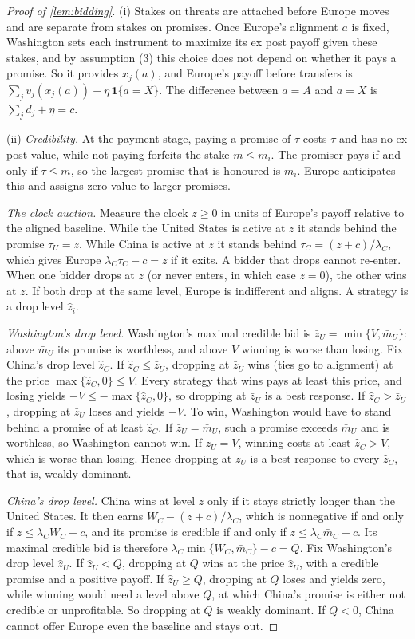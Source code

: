 \begin{proof}[Proof of \cref{lem:bidding}]
(i) Stakes on threats are attached before Europe moves and are separate from stakes on promises. Once Europe's alignment $a$ is fixed, Washington sets each instrument to maximize its ex post payoff given these stakes, and by assumption (3) this choice does not depend on whether it pays a promise. So it provides $x_j(a)$, and Europe's payoff before transfers is $\sum_j v_j(x_j(a))-\eta\,\mathbf 1\{a=X\}$. The difference between $a=A$ and $a=X$ is $\sum_j d_j+\eta=c$.

(ii) \emph{Credibility.} At the payment stage, paying a promise of $\tau$ costs $\tau$ and has no ex post value, while not paying forfeits the stake $m\le\bar m_i$. The promiser pays if and only if $\tau\le m$, so the largest promise that is honoured is $\bar m_i$. Europe anticipates this and assigns zero value to larger promises.

\emph{The clock auction.} Measure the clock $z\ge 0$ in units of Europe's payoff relative to the aligned baseline. While the United States is active at $z$ it stands behind the promise $\tau_U=z$. While China is active at $z$ it stands behind $\tau_C=(z+c)/\lambda_C$, which gives Europe $\lambda_C\tau_C-c=z$ if it exits. A bidder that drops cannot re-enter. When one bidder drops at $z$ (or never enters, in which case $z=0$), the other wins at $z$. If both drop at the same level, Europe is indifferent and aligns. A strategy is a drop level $\hat z_i$.

\emph{Washington's drop level.} Washington's maximal credible bid is $\bar z_U=\min\{V,\bar m_U\}$: above $\bar m_U$ its promise is worthless, and above $V$ winning is worse than losing. Fix China's drop level $\hat z_C$. If $\hat z_C\le\bar z_U$, dropping at $\bar z_U$ wins (ties go to alignment) at the price $\max\{\hat z_C,0\}\le V$. Every strategy that wins pays at least this price, and losing yields $-V\le-\max\{\hat z_C,0\}$, so dropping at $\bar z_U$ is a best response. If $\hat z_C>\bar z_U$, dropping at $\bar z_U$ loses and yields $-V$. To win, Washington would have to stand behind a promise of at least $\hat z_C$. If $\bar z_U=\bar m_U$, such a promise exceeds $\bar m_U$ and is worthless, so Washington cannot win. If $\bar z_U=V$, winning costs at least $\hat z_C>V$, which is worse than losing. Hence dropping at $\bar z_U$ is a best response to every $\hat z_C$, that is, weakly dominant.

\emph{China's drop level.} China wins at level $z$ only if it stays strictly longer than the United States. It then earns $W_C-(z+c)/\lambda_C$, which is nonnegative if and only if $z\le\lambda_C W_C-c$, and its promise is credible if and only if $z\le\lambda_C\bar m_C-c$. Its maximal credible bid is therefore $\lambda_C\min\{W_C,\bar m_C\}-c=Q$. Fix Washington's drop level $\hat z_U$. If $\hat z_U<Q$, dropping at $Q$ wins at the price $\hat z_U$, with a credible promise and a positive payoff. If $\hat z_U\ge Q$, dropping at $Q$ loses and yields zero, while winning would need a level above $Q$, at which China's promise is either not credible or unprofitable. So dropping at $Q$ is weakly dominant. If $Q<0$, China cannot offer Europe even the baseline and stays out.


\end{proof}
